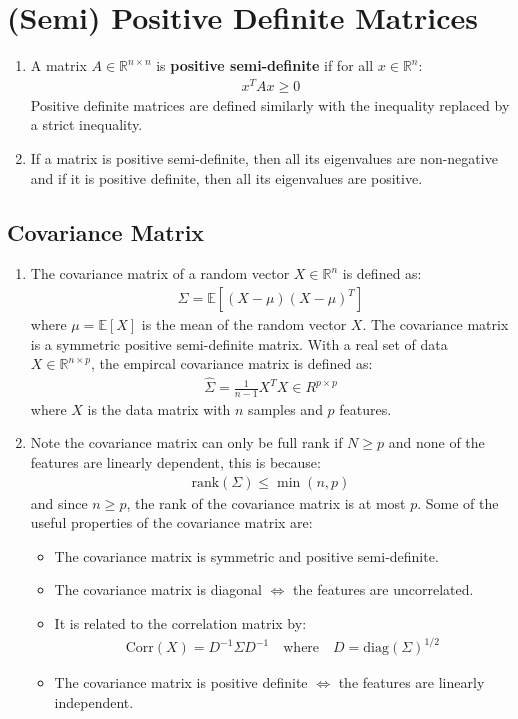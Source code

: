\documentclass[letterpaper, 11pt]{article}
\newcommand{\R}{\mathbb{R}}	%
\newcommand{\E}{\mathbb{E}}	%
\newcommand{\1}{\mathds{1}}	%
\theoremstyle{definition}
\begin{document}
\section{(Semi) Positive Definite Matrices}
\begin{enumerate}
    \item A matrix $A \in \R^{n \times n}$ is \textbf{positive semi-definite} if for all $x \in \R^n$:
    \begin{align}
        x^T A x \geq 0 
    \end{align}
    Positive definite matrices are defined similarly with the inequality replaced by a strict inequality.
    \item If a matrix is positive semi-definite, then all its eigenvalues are non-negative and if it is positive definite, then all its eigenvalues are positive.

\end{enumerate}

\subsection{Covariance Matrix}
\begin{enumerate}
    \item The covariance matrix of a random vector $X \in \R^n$ is defined as:
    \begin{align}
        \Sigma = \E[(X - \mu)(X - \mu)^T]
    \end{align}
    where $\mu = \E[X]$ is the mean of the random vector $X$. The covariance matrix is a symmetric positive semi-definite matrix. 
    With a real set of data $X \in \R^{n \times p}$, the empircal covariance matrix is defined as:
    \begin{align}
        \hat{\Sigma} = \frac{1}{n - 1} X^T X \in R^{p \times p}
    \end{align}
    where $X$ is the data matrix with $n$ samples and $p$ features.
    \item Note the covariance matrix can only be full rank if $N \ge p$ and none of the features 
    are linearly dependent, this is because:
    \begin{align}
        \text{rank}(\Sigma) \le \min(n,p)
    \end{align}
    and since $n \ge p$, the rank of the covariance matrix is at most $p$. Some of the 
    useful properties of the covariance matrix are:
    \begin{itemize}
        \item The covariance matrix is symmetric and positive semi-definite.
        \item The covariance matrix is diagonal $\iff$ the features are uncorrelated.
        \item It is related to the correlation matrix by:
        \begin{align}
            \text{Corr}(X) = D^{-1} \Sigma D^{-1} \quad \text{where} \quad D = \text{diag}(\Sigma)^{1/2}
        \end{align}
        \item The covariance matrix is positive definite $\iff$ the features are linearly independent.
    \end{itemize}    
\end{enumerate}
\end{document}
